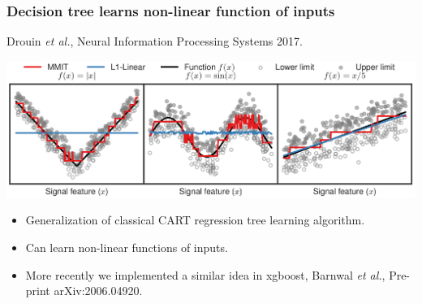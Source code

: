 \documentclass{beamer}
\begin{document}
\begin{frame}
  \frametitle{Decision tree learns non-linear function of inputs}
  
  Drouin \emph{et al.}, Neural Information Processing Systems 2017.

  \includegraphics[width=\linewidth]{mmit-functions}
  \begin{itemize}
  \item Generalization of classical CART regression tree learning algorithm.
  \item Can learn non-linear functions of inputs.
  \item More recently we implemented a similar idea in xgboost,
    Barnwal \emph{et al.}, Pre-print arXiv:2006.04920.
  \end{itemize}
\end{frame}
\end{document}
